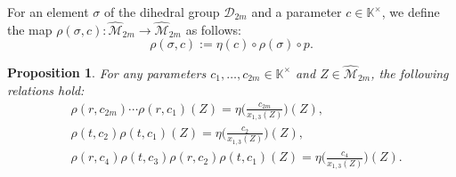 \documentclass[11pt]{amsart}
\theoremstyle{plain}
\newtheorem{proposition}{Proposition}
\theoremstyle{definition}
\theoremstyle{remark}
\begin{document}

For an element $\sigma$ of the dihedral group $\mathcal{D}_{2m}$ and a parameter
$c\in \mathbb{K}^\times$, we define the map $\rho(\sigma,c) \colon \widehat{\mathcal{M}}_{2m} \to \widehat{\mathcal{M}}_{2m}$ as follows:
\begin{equation}
    \rho(\sigma,c):=\eta(c)\circ\rho(\sigma)\circ p. \label{def:rhoEven}
\end{equation}

\begin{proposition}
For any parameters $c_1, \dots, c_{2m}\in\mathbb{K}^\times$ and $Z\in\widehat{\mathcal{M}}_{2m}$, the following relations hold:
\begin{align}
&\rho(r,c_{2m})\cdots\rho(r,c_{1})(Z)=
\eta\biggl(\frac{c_{2m}}{x_{1,3}(Z)}\biggr)(Z), \\
&\rho(t,c_{2})\rho(t,c_{1})(Z)=
\eta\biggl(\frac{c_2}{x_{1,3}(Z)}\biggr)(Z), \\
&\rho(r,c_{4})\rho(t,c_{3})\rho(r,c_{2})\rho(t,c_{1})(Z)=
\eta\biggl(\frac{c_{4}}{x_{1,3}(Z)}\biggr)(Z).
\end{align}
\end{proposition}
\end{document}
